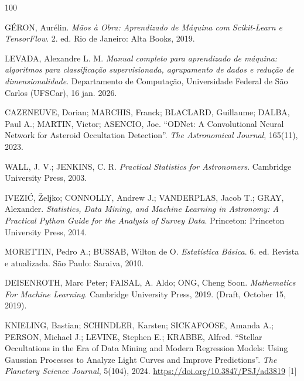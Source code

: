 \documentclass[msc]{on} %
\providecommand{\DIFaddtex}[1]{{\protect\color{red}#1}} %
\providecommand{\DIFaddbegin}{} %
\providecommand{\DIFaddend}{} %
\providecommand{\DIFadd}[1]{\texorpdfstring{\DIFaddtex{#1}}{#1}} %
\begin{document}
\begin{thebibliography}{100}

 G\'ERON, Aur\'elin. \textit{M\~aos \`a Obra: Aprendizado de M\'aquina com Scikit-Learn e TensorFlow}. 2. ed. Rio de Janeiro: Alta Books, 2019.

 LEVADA, Alexandre L. M. \textit{Manual completo para aprendizado de m\'aquina: algoritmos para classifica\c{c}\~ao supervisionada, agrupamento de dados e redu\c{c}\~ao de dimensionalidade}. Departamento de Computa\c{c}\~ao, Universidade Federal de S\~ao Carlos (UFSCar), 16 jan. 2026.

 CAZENEUVE, Dorian; MARCHIS, Franck; BLACLARD, Guillaume; DALBA, Paul A.; MARTIN, Victor; ASENCIO, Joe. ``ODNet: A Convolutional Neural Network for Asteroid Occultation Detection''. \emph{The Astronomical Journal}, 165(11), 2023.

 WALL, J. V.; JENKINS, C. R. \textit{Practical Statistics for Astronomers}. Cambridge University Press, 2003.

\DIFaddbegin {} \DIFadd{IVEZI\'C, \v{Z}eljko; CONNOLLY, Andrew J.; VANDERPLAS, Jacob T.; GRAY, Alexander. }\textit{\DIFadd{Statistics, Data Mining, and Machine Learning in Astronomy: A Practical Python Guide for the Analysis of Survey Data}}\DIFadd{. Princeton: Princeton University Press, 2014.
}

\DIFaddend {} MORETTIN, Pedro A.; BUSSAB, Wilton de O. \textit{Estatística Básica}. 6. ed. Revista e atualizada. São Paulo: Saraiva, 2010.

 DEISENROTH, Marc Peter; FAISAL, A. Aldo; ONG, Cheng Soon. \textit{Mathematics For Machine Learning}. Cambridge University Press, 2019. (Draft, October 15, 2019).

 KNIELING, Bastian; SCHINDLER, Karsten; SICKAFOOSE, Amanda A.; PERSON, Michael J.; LEVINE, Stephen E.; KRABBE, Alfred. ``Stellar Occultations in the Era of Data Mining and Modern Regression Models: Using Gaussian Processes to Analyze Light Curves and Improve Predictions''. \emph{The Planetary Science Journal}, 5(104), 2024. \url{https://doi.org/10.3847/PSJ/ad3819} [1]


\end{thebibliography}
\end{document}
